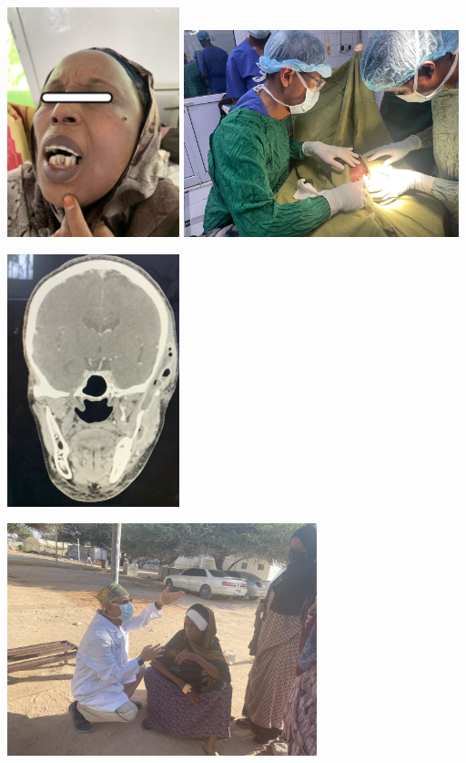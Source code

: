 \documentclass[
paper=landscape,
paper=160mm:90mm, %
fontsize=11pt, %
pagesize, %
parskip=half-, %
]{scrartcl} %
\theoremstyle{mythmstyle} %
\begin{document}
\clearpage
\includegraphics[width=5cm]{IMG_5180_photo_preOP_face.jpg}
\clearpage
\includegraphics[width=8cm]{IMG_5286_localAnesthesia_IandD.JPG}


\clearpage
\includegraphics[width=5cm]{IMG_5296_CT_temporalAbscess.jpg}

\clearpage
\includegraphics[width=9cm]{IMG_2114.JPG}
\clearpage
\end{document}
